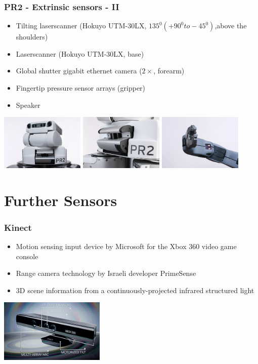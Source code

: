\documentclass[t]{beamer}
\begin{document}
\begin{frame}
  \frametitle{PR2 - Extrinsic sensors - II}
\begin{itemize}
    \item Tilting laserscanner (Hokuyo UTM-30LX, $135^0 (+90^0 to -45^0)$,above the shoulders)
    \item Laserscanner (Hokuyo UTM-30LX, base)
    \item Global shutter gigabit ethernet camera ($2\times$, forearm)
    \item Fingertip pressure sensor arrays (gripper)
    \item Speaker
\end{itemize}
\hspace{-4ex}
\includegraphics[width=4cm]{img/head_tiltLRF.jpg} 
\includegraphics[width=4cm]{img/tilted_lrf.jpg}
\includegraphics[width=4cm]{img/pr2_hand_camera.jpg}  
\end{frame}

\section{Further Sensors}

\begin{frame} 
 \frametitle{Kinect}
\begin{itemize}
 \item Motion sensing input device by Microsoft for the Xbox 360 video game console
 \item Range camera technology by Israeli developer PrimeSense
 \item 3D scene information from a continuously-projected infrared structured light
\end{itemize}
\hspace{35ex}\includegraphics[width=5cm]{img/kinect.png}
\end{frame}
\end{document}
